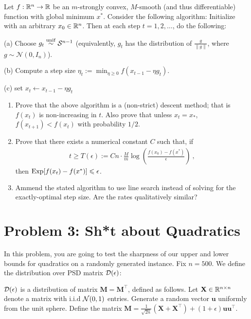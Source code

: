 \documentclass[12pt]{article}
\begin{document}
	Let $f: \mathbb{R}^n \to \mathbb{R}$ be an $m$-strongly convex, $M$-smooth (and thus differentiable) function with global minimum $x^*$. 
%
	Consider the following algorithm: Initialize with an arbitrary $x_0 \in \mathbb{R}^n$. 
%
	Then at each step $t = 1,2,\dots$, do the following: 

	(a) Choose $g_t \overset{\mathrm{unif}}{\sim} {\cal S}^{n-1}$ (equivalently, $g_t$ has the distribution of $\frac{g}{\|g\|}$, where $g\sim \mathcal{N}(0,I_n)$). 

	(b) Compute a step size $\eta_t := \min_{\eta \ge 0} f(x_{t-1}-\eta g_t)$.

	(c) set $x_t \leftarrow x_{t-1}-\eta g_t$

\begin{enumerate}
	\item Prove that the above algorithm is a (non-strict) descent method; that is $f(x_t)$ is non-increasing in $t$. Also prove that unless $x_t = x_*$, $f(x_{t+1}) < f(x_t)$ with probability $1/2$. 
	\item Prove that there exists a numerical constant $C$ such that, if 
	\begin{eqnarray}
	t \ge T(\epsilon) := C n \cdot \frac{M}{m} \log (\frac{f(x_0) - f(x^*)}{\epsilon})~,
	\end{eqnarray}
	then $\mathrm{Exp}[f(x_t) - f(x^*)] \leqslant \epsilon$. 
	\item Ammend the stated algorithm to use line search instead of solving for the exactly-optimal step size. Are the rates qualitatively similar?
\end{enumerate}
\section*{Problem 3: Sh*t about Quadratics}
	In this problem, you are going to test the sharpness of our upper and lower bounds for quadratics on a randomly generated instance. Fix $n = 500$. We define the distribution over PSD matrix ${\cal D}(\epsilon)$:
	\begin{definition} ${\cal D}(\epsilon)$ is a distribution of matrix $\mathbf{M} = \mathbf{M}^\top$, defined as follows. Let $\mathbf{X} \in \mathbb{R}^{n \times n}$ denote a matrix with i.i.d ${\cal N}(0,1)$ entries. Generate a random vector $\mathbf{u}$ uniformly from the unit sphere. Define the matrix $\mathbf{M} = \frac{1}{\sqrt{2n}}(\mathbf{X} + \mathbf{X}^{\top}) + (1+\epsilon)\mathbf{u}\mathbf{u}^\top$.
	\end{definition}
\end{document}
